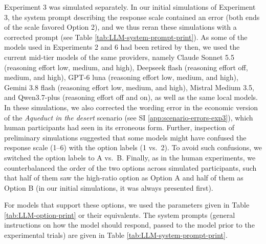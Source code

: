 \documentclass[
]{article}
\begin{document}
Experiment 3 was simulated separately. In our initial simulations of Experiment 3, the system prompt describing the response scale contained an error (both ends of the scale favored Option 2), and we thus reran these simulations with a corrected prompt (see Table \ref{tab:LLM-system-prompt-print}). As some of the models used in Experiments 2 and 6 had been retired by then, we used the current mid-tier models of the same providers, namely Claude Sonnet 5.5 (reasoning effort low, medium, and high), Deepseek flash (reasoning effort off, medium, and high), GPT-6 luna (reasoning effort low, medium, and high), Gemini 3.8 flash (reasoning effort low, medium, and high), Mistral Medium 3.5, and Qwen3.7-plus (reasoning effort off and on), as well as the same local models. In these simulations, we also corrected the wording error in the economic version of the \emph{Aqueduct in the desert} scenario (see SI \ref{app:scenario-errors-exp3}), which human participants had seen in its erroneous form. Further, inspection of preliminary simulations suggested that some models might have confused the response scale (1--6) with the option labels (1 vs.~2). To avoid such confusions, we switched the option labels to A vs.~B. Finally, as in the human experiments, we counterbalanced the order of the two options across simulated participants, such that half of them saw the high-ratio option as Option A and half of them as Option B (in our initial simulations, it was always presented first).

For models that support these options, we used the parameters given in Table \ref{tab:LLM-option-print} or their equivalents. The system prompts (general instructions on how the model should respond, passed to the model prior to the experimental trials) are given in Table \ref{tab:LLM-system-prompt-print}.
\end{document}
